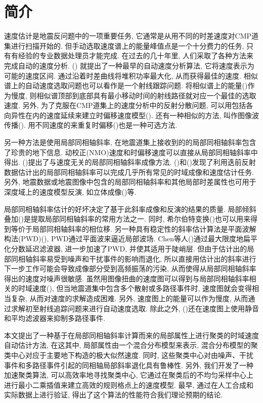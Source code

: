 \section{简介}
速度估计是地震反问题中的一项重要任务, 它通常是从用不同的时差速度对CMP道集进行扫描开始的. 但手动选取速度谱上的能量峰值点是一个十分费力的任务, 只有有经验的专业数据处理员才能完成. 在过去的几十年里, 人们采取了各种方法来完成自动的速度分析. \citeauthor{Toldi1989}(\citeyear{Toldi1989}) 就提出了一种最早的自动速度分析算法, 它将速度表示为可能的速度区间. 通过沿着时差曲线将堆积功率最大化, 从而获得最佳的速度. 相似谱上的自动速度选取问题也可以看作是一个射线跟踪问题. 将相似谱上的能量(\cite{Fomel2009})作为慢度, 则相似谱顶部到底部具有最小移动时间的射线路径就对应一个最佳的选取速度. 另外, 为了克服在CMP道集上的速度分析中的反射分散问题, 可以用包括各向异性在内的速度延续来建立时偏移速度模型(\cite{Adler2002,Fomel2003,Alkhalifah2011,Burnett2011}). 还有一种相似的方法, 叫作图像波传播(\cite{Schleicher2008}). 用不同速度的来重复时偏移(\cite{Yilmaz2001a})也是一种可选方法. 

另一种方法是使用局部同相轴斜率, 在地震道集上接收到的的局部同相轴斜率包含了珍贵的地下信息. 动校正(NMO)速度和时偏移速度可以直接从局部同相轴斜率中得出. \citeauthor{Ottolini1983}(\citeyear{Ottolini1983})提出了与速度无关的局部同相轴斜率成像方法. \citeauthor{Fomel2007}(\citeyear{Fomel2007})和\citeauthor{Cooke2009}(\citeyear{Cooke2009})发现了利用迭前反射数据估计出的局部同相轴斜率可以完成几乎所有常见的时域成像和速度估计任务. 另外, 地震数据或地震图像中包含的局部同相轴斜率和其他局部时差属性也可用于深度域上的速度模型反演, 如立体成像(\cite{Billette1998,Lambare2008})等. 

局部同相轴斜率估计的好坏决定了基于此斜率成像和反演的结果的质量. 局部倾斜叠加(\cite{Ottolini1983})是提取局部同相轴斜率的常用方法之一. 同时, 希尔伯特变换(\cite{Barnes1996,Cooke2009,Zhang2013,Wang2015})也可以用来得到等价于局部同相轴斜率的相位移. 另一种具有稳定性的斜率估计算法是平面波解构法(PWD)(\cite{Fomel2002, Schleicher2009}), PWD通过平面波来逼近局部波场. Chen等人(\cite{Chen2013,Chen2013a})通过最大限度地扁平化分数延迟滤波器, 进一步加速了PWD, 并使其适用于陡峭层. 但由于估计出的局部同相轴斜率易受到噪声和干扰事件的影响而退化, 所以直接用估计出的斜率进行下一步工作可能会导致成像部分受到高频振荡的污染, 从而使得从局部同相轴斜率得出的速度对噪声很敏感. 虽然用图像扭曲的速度图可以得到与局部同相轴斜率相关的时域速度(\cite{Fomel2007}), 但当地震道集中包含多个散射或多路径事件时, 速度图就会变得相当复杂, 从而对速度的求解造成困难. 另外, 速度图上的能量可以作为慢度, 从而通过求解初至射线追踪问题来进行自动速度选取. 除此之外, \citeauthor{Cooke2009}(\citeyear{Cooke2009})还在速度图上使用静音和平均滤波器来抑制多路径事件. 

本文提出了一种基于在局部同相轴斜率计算而来的局部属性上进行聚类的时域速度自动估计方法, 在这其中, 局部属性由一个混合分布模型来表示, 混合分布模型的聚类中心对应于主要地下构造的极大似然速度. 同时, 这些聚类中心对由噪声、干扰事件和多路径事件引起的同相轴局部斜率退化具有鲁棒性. 另外, 我们开发了一种加速聚类算法, 可以高效率地寻找聚类中心, 它通过在聚类后的不均匀采样中心上进行最小二乘插值来建立高效的规则格点上的速度模型. 最早, 通过在人工合成和实际数据上进行验证, 得出了这个算法的性能符合我们理论预期的结论. 
